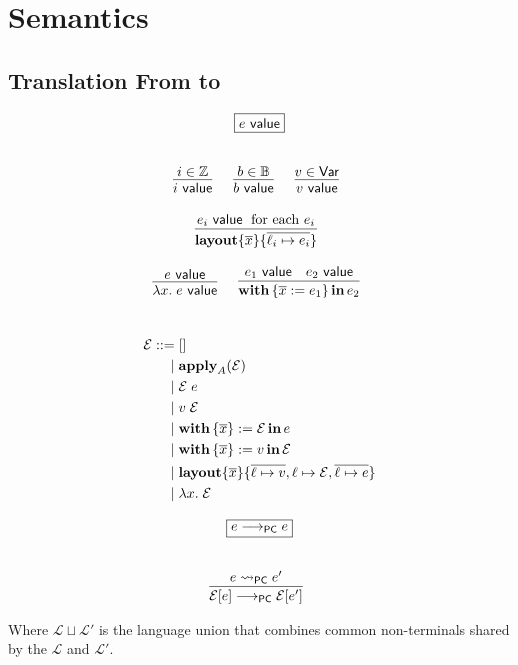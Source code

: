 \section{Semantics}

\subsection{Translation From \Pika{} to \PikaCore}


\[
  \begin{array}{c}
    \fbox{$e ~\val$}
    \fboxNewlines
    \labinfer{i ~\val}{i \in \mathbb{Z}}
    ~~~
    \labinfer{b ~\val}{b \in \mathbb{B}}
    ~~~
    \labinfer{v ~\val}{v \in \Var}
    \\\\
    \labinfer{\sslmath{\overline{x}}{\overline{\ell_i \mapsto e_i}}}
      {e_i ~\val \;\textrm{ for each $e_i$}}
    \\\\
    \labinfer{\lambda x.\; e ~\val}{e ~\val}
    ~~~
    \labinfer{\withIn{\{\overline{x} := e_1\}} e_2}
      {e_1 ~\val & e_2 ~\val}
  \end{array}
\]
\\

\[
  \begin{aligned}
  \mathcal{E}
    ::=\; &[]\\
    \mid\; &\textbf{apply}_A(\mathcal{E})\\
    \mid\; &\mathcal{E}\; e\\
    \mid\; &v\; \mathcal{E}\\
    \mid\; &\textbf{with}\,\{ \overline{x} \} := \mathcal{E}\,\textbf{in}\, e\\
    \mid\; &\textbf{with}\,\{ \overline{x} \} := v\,\textbf{in}\, \mathcal{E}\\
    \mid\; &\textbf{layout}\{ \overline{x} \}\{ \overline{\ell \mapsto v}, \ell \mapsto \mathcal{E}, \overline{\ell \mapsto e} \}\\
    \mid\; &\lambda x.\; \mathcal{E}
  \end{aligned}
\]

\[
  \begin{array}{c}
    \fbox{$e \pcstep e$}
    \fboxNewlines
    \labinfer{\mathcal{E}[e] \pcstep \mathcal{E}[e']}
      {e \pcNotionStep e'}
  \end{array}
\]

Where $\mathcal{L} \sqcup \mathcal{L}'$ is the language union that combines common non-terminals shared by the $\mathcal{L}$ and $\mathcal{L}'$.

